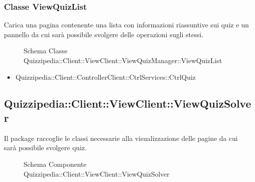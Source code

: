 \subsubsection{Classe ViewQuizList}
Carica una pagina contenente una lista con informazioni riassuntive sui quiz e un pannello da cui sarà possibile svolgere delle operazioni sugli stessi.
\begin{figure}[H]
\centering
\noindent{}
\caption[Schema Classe ViewQuizList]{Schema Classe Quizzipedia::Client::ViewClient::ViewQuizManager::ViewQuizList}
\end{figure}
\begin{itemize}
\item Quizzipedia::Client::ControllerClient::CtrlServices::CtrlQuiz
\end{itemize}
\subsection{Quizzipedia::Client::ViewClient::ViewQuizSolver}
Il package raccoglie le classi necessarie alla visualizzazione delle pagine da cui sarà possibile svolgere quiz.
\begin{figure}[H]
\centering
\noindent{}
\caption[Schema Componente Quizzipedia::Client::ViewClient::ViewQuizSolver]{Schema Componente Quizzipedia::Client::ViewClient::ViewQuizSolver}
\end{figure}
